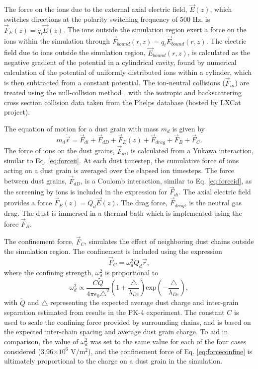 \documentclass[aip,amsmath,amssymb,graphicx,floatfix,reprint]{revtex4-1}
\begin{document}
The force on the ions due to the external axial electric field, $\vec{E}(z)$, which switches directions at the polarity switching frequency of 500 Hz, is $\vec{F}_E(z) = q_i \vec{E}(z)$.  The ions outside the simulation region exert a force on the ions within the simulation through $\vec{F}_{bound}(r,z) = q_i \vec{E}_{bound}(r,z)$.  The electric field due to ions outside the simulation region, $\vec{E}_{bound}(r,z)$, is calculated as the negative gradient of the potential in a cylindrical cavity, found by numerical calculation of the potential of uniformly distributed ions within a cylinder, which is then subtracted from a constant potential.
The ion-neutral collisions ($\vec{F}_{in}$) are treated using the null-collision method \cite{Skullerud1968,Donko2011}, with the isotropic and backscattering cross section collision data taken from the Phelps database (hosted by LXCat project)\cite{Carbone2021}.

The equation of motion for a dust grain with mass $m_d$ is given by 
\begin{equation} m_d \ddot{\vec{r}} = \vec{F}_{di} + \vec{F}_{dD} + \vec{F}_E(z) + \vec{F}_{drag} + \vec{F}_{B} + \vec{F}_{C}.\label{eq:dusteqmotion}\end{equation}
The force of ions on the dust grains, $\vec{F}_{di}$, is calculated from a Yukawa interaction, similar to Eq. \ref{eq:forceii}.  At each dust timestep, the cumulative force of ions acting on a dust grain is averaged over the elapsed ion timesteps.  The force between dust grains, $\vec{F}_{dD}$, is a Coulomb interaction, similar to Eq. \ref{eq:forceid}, as the screening by ions is included in the expression for $\vec{F}_{di}$.  The axial electric field provides a force $\vec{F}_E(z)=Q_d \vec{E}(z)$. The drag force, $\vec{F}_{drag}$, is the neutral gas drag.  The dust is immersed in a thermal bath which is implemented using the force $\vec{F}_B$.

The confinement force, $\vec{F}_C$, simulates the effect of neighboring dust chains outside the simulation region.  The confinement is included using the expression \begin{equation} \vec{F}_C = \omega_d^2 Q_d\vec{r} ,\label{eq:forceconfine}\end{equation} where the confining strength, $\omega_d^2$ is proportional to  \begin{equation}\omega_d^2 \propto \frac{C\tilde{Q}}{4 \pi \epsilon_0 \triangle^2}\left(1+\frac{\triangle}{\lambda_{De}}\right)\mathrm{exp}\left(-\frac{\triangle}{\lambda_{De}}\right),\label{eq:omega}\end{equation} with $\tilde{Q}$ and $\triangle$ representing the expected average dust charge and inter-grain separation estimated from results in the PK-4 experiment.  The constant $C$ is used to scale the confining force provided by surrounding chains, and is based on the expected inter-chain spacing and average dust grain charge.  To aid in comparison, the value of $\omega_d^2$ was set to the same value for each of the four cases considered (3.96$\times10^{6}$ V/m$^2$), and the confinement force of Eq. \ref{eq:forceconfine} is ultimately proportional to the charge on a dust grain in the simulation.
\end{document}
